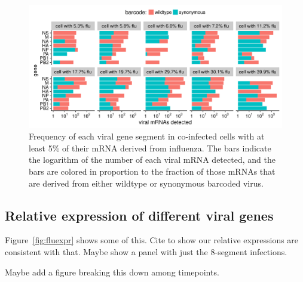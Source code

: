 \documentclass[9pt,lineno]{elife}
\begin{document}
\begin{figure}
\includegraphics[width=\linewidth]{figures/p_coinfection.pdf}
\caption{\label{fig:coexpression}
Frequency of each viral gene segment in co-infected cells with at least 5\% of their mRNA derived from influenza.
The bars indicate the logarithm of the number of each viral mRNA detected, and the bars are colored in proportion to the fraction of those mRNAs that are derived from either wildtype or synonymous barcoded virus.
}
\end{figure}

\subsection{Relative expression of different viral genes}
Figure~\ref{fig:fluexpr} shows some of this.
Cite \citet{hatada1989control} to show our relative expressions are consistent with that.
Maybe show a panel with just the 8-segment infections.

Maybe add a figure breaking this down among timepoints.
\end{document}
